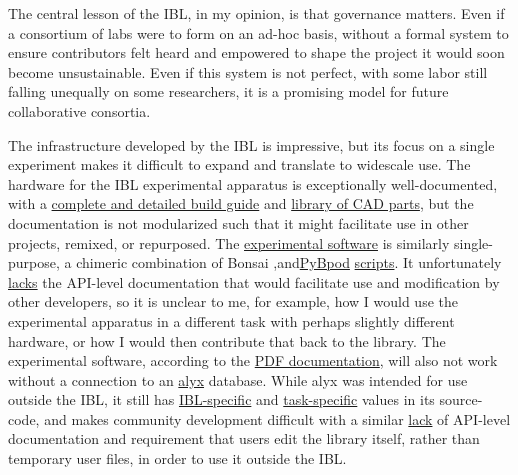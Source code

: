 \documentclass[nohyper]{tufte-book-jls}
\begin{document}
The central lesson of the IBL, in my opinion, is that governance
matters. Even if a consortium of labs were to form on an ad-hoc basis,
without a formal system to ensure contributors felt heard and empowered
to shape the project it would soon become unsustainable. Even if this
system is not perfect, with some labor still falling unequally on some
researchers, it is a promising model for future collaborative consortia.

The infrastructure developed by the IBL is impressive, but its focus on
a single experiment makes it difficult to expand and translate to
widescale use. The hardware for the IBL experimental apparatus is
exceptionally well-documented, with a
\href{https://figshare.com/articles/preprint/A_standardized_and_reproducible_method_to_measure_decision-making_in_mice_Appendix_3_IBL_protocol_for_setting_up_the_behavioral_training_rig/11634732}{complete
and detailed build guide} and
\href{https://figshare.com/articles/online_resource/A_standardized_and_reproducible_method_to_measure_decision-making_in_mice_CAD_files_for_behavior_rig/11639973}{library
of CAD parts}, but the documentation is not modularized such that it
might facilitate use in other projects, remixed, or repurposed. The
\href{https://github.com/int-brain-lab/iblrig}{experimental software} is
similarly single-purpose, a chimeric combination of Bonsai \cite{lopesBonsaiEventbasedFramework2015},and\href{https://github.com/pybpod/pybpod}{PyBpod}
\href{https://github.com/int-brain-lab/iblrig/tree/master/tasks/_iblrig_tasks_ephysChoiceWorld}{scripts}.
It unfortunately
\href{https://iblrig.readthedocs.io/en/latest/index.html}{lacks} the
API-level documentation that would facilitate use and modification by
other developers, so it is unclear to me, for example, how I would use
the experimental apparatus in a different task with perhaps slightly
different hardware, or how I would then contribute that back to the
library. The experimental software, according to the
\href{https://figshare.com/articles/preprint/A_standardized_and_reproducible_method_to_measure_decision-making_in_mice_Appendix_3_IBL_protocol_for_setting_up_the_behavioral_training_rig/11634732}{PDF
documentation}, will also not work without a connection to an
\href{https://github.com/cortex-lab/alyx}{alyx} database. While alyx was
intended for use outside the IBL, it still has
\href{https://github.com/cortex-lab/alyx/blob/07f481f6bbde668b81ad2634f4c42df4d6a74e44/alyx/data/management/commands/files.py\#L188}{IBL-specific}
and
\href{https://github.com/cortex-lab/alyx/blob/07f481f6bbde668b81ad2634f4c42df4d6a74e44/alyx/data/fixtures/data.datasettype.json\#L29}{task-specific}
values in its source-code, and makes community development difficult
with a similar \href{https://alyx.readthedocs.io/en/latest/}{lack} of
API-level documentation and requirement that users edit the library
itself, rather than temporary user files, in order to use it outside the
IBL.
\end{document}

